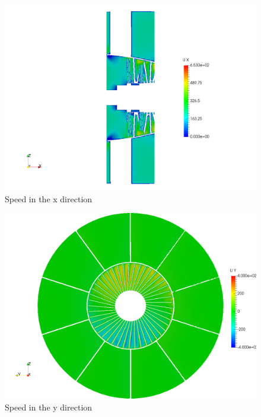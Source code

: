 \begin{figure}[h!]
\centering
\includegraphics[scale=0.28]{./img/screenshoots/Ux2.png}
\caption{Speed in the x direction}
\label{ux2}
\end{figure}

\newpage{}

\begin{figure}[h!]
\centering
\includegraphics[scale=0.28]{./img/screenshoots/Uy1.png}
\caption{Speed in the y direction}
\label{uy1}
\end{figure}

